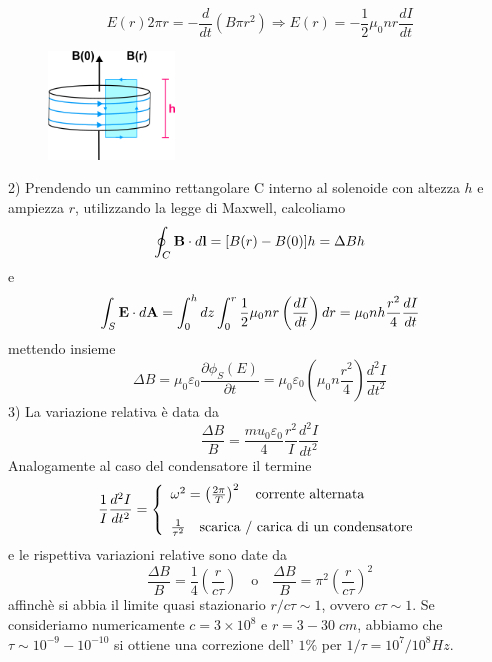 \begin{equation*}
	E(r)2 \pi r = - \frac{d}{dt}(B \pi r^2) \Rightarrow E(r) = -\frac{1}{2}\mu_0 n r \frac{dI}{dt}
\end{equation*}
\begin{figure} %
    \centering
    \includegraphics[width=0.3\textwidth]{images/circular_path1} %
\end{figure}

2) Prendendo un cammino rettangolare  C interno al solenoide con altezza $h$ e ampiezza $r$, utilizzando la legge di Maxwell, calcoliamo
\begin{equation*}
	\oint_{C} \bold{B} \cdot d \bold{l} = [B(r) - B(0)]h = \Delta B h
\end{equation*}  
e 
\begin{equation*}
	\int_{S} \bold{E} \cdot d\bold{A} = \int_{0}^{h}dz \int_{0}^{r} \frac{1}{2}\mu_0 n r \left(\frac{dI}{dt}\right)dr = \mu_0 n h \frac{r^2}{4}\frac{dI}{dt} 
\end{equation*}
mettendo insieme 
\begin{equation*}
	\Delta B = \mu_0 \varepsilon_0 \frac{\partial \phi_{S}(E)}{\partial t} = \mu_0 \varepsilon_0 \left(\mu_0 n \frac{r^2}{4}\right) \frac{d^2I}{dt^2}
\end{equation*}
3) La variazione relativa \`e data da 
\begin{equation*}
	\frac{\Delta B}{B} = \frac{mu_0 \varepsilon_0}{4} \frac{r^2}{I} \frac{d^2I}{dt^2}
\end{equation*}
Analogamente al caso del condensatore il termine 
\begin{align*}
	\frac{1}{I}\frac{d^2I}{dt^2} = \left \{ \begin{array}{l}
		\omega^2 = \left(\frac{2\pi}{T}\right)^2 \quad \text{corrente alternata} \\ \rule{0pt}{20pt}
		\frac{1}{\tau^2} \quad \text{scarica / carica di un condensatore}
	\end{array}\right.
\end{align*}
e le rispettiva variazioni relative sono date da 
\begin{equation*}
	\frac{\Delta B}{B} = \frac{1}{4} \left(\frac{r}{c \tau}\right) \quad \text{o} \quad \frac{\Delta B}{B} = \pi^2 \left(\frac{r}{c \tau}\right)^2
\end{equation*} 
affinch\`e si abbia il limite quasi stazionario $r/c\tau \sim 1$, ovvero $c \tau \sim 1$. 
Se consideriamo numericamente $c = 3 \times 10^8$ e $r = 3 - 30\;cm$, abbiamo che $\tau \sim 10^{-9} -10^{-10}$ si ottiene una correzione dell' $1 \%$ per $1/\tau = 10^7/10^8 Hz$.

